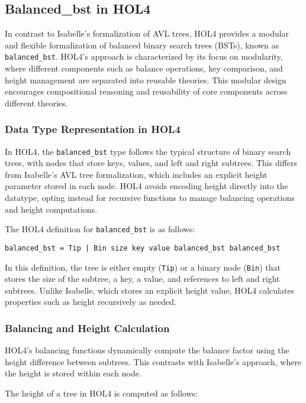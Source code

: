 \documentclass[12pt]{article}
\begin{document}
\subsection{Balanced\_bst in HOL4}

In contrast to Isabelle’s formalization of AVL trees, HOL4 \cite{HOLBalancedBST} provides a modular and flexible formalization of balanced binary search trees (BSTs), known as \texttt{balanced\_bst}. HOL4's approach is characterized by its focus on modularity, where different components such as balance operations, key comparison, and height management are separated into reusable theories. This modular design encourages compositional reasoning and reusability of core components across different theories.

\subsubsection{Data Type Representation in HOL4}
In HOL4, the \texttt{balanced\_bst} type follows the typical structure of binary search trees, with nodes that store keys, values, and left and right subtrees. This differs from Isabelle's AVL tree formalization, which includes an explicit height parameter stored in each node. HOL4 avoids encoding height directly into the datatype, opting instead for recursive functions to manage balancing operations and height computations.

The HOL4 definition for \texttt{balanced\_bst} is as follows:

\begin{verbatim}
balanced_bst = Tip | Bin size key value balanced_bst balanced_bst
\end{verbatim}

In this definition, the tree is either empty (\texttt{Tip}) or a binary node (\texttt{Bin}) that stores the size of the subtree, a key, a value, and references to left and right subtrees. Unlike Isabelle, which stores an explicit height value, HOL4 calculates properties such as height recursively as needed.

\subsubsection{Balancing and Height Calculation}
HOL4’s balancing functions dynamically compute the balance factor using the height difference between subtrees. This contrasts with Isabelle’s approach, where the height is stored within each node.

The height of a tree in HOL4 is computed as follows:
\end{document}
